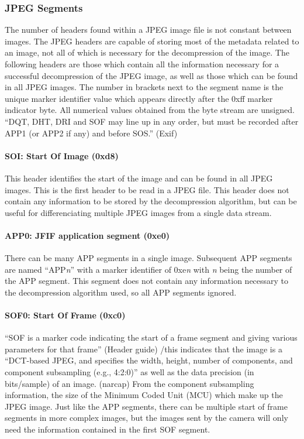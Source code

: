 \documentclass[oneside]{ecsgdp}         %
\begin{document}
\subsubsection{JPEG Segments}
The number of headers found within a JPEG image file is not constant between images. The JPEG headers are capable of storing most of the metadata related to an image, not all of which is necessary for the decompression of the image. The following headers are those which contain all the information necessary for a successful decompression of the JPEG image, as well as those which can be found in all JPEG images. The number in brackets next to the segment name is the unique marker identifier value which appears directly after the 0xff marker indicator byte. All numerical values obtained from the byte stream are unsigned. ``DQT, DHT, DRI and SOF may line up in any order, but must be recorded after APP1 (or APP2 if any) and before SOS.'' (Exif)

\paragraph*{SOI: Start Of Image (0xd8)}
This header identifies the start of the image and can be found in all JPEG images. This is the first header to be read in a JPEG file. This header does not contain any information to be stored by the decompression algorithm, but can be useful for differenciating multiple JPEG images from a single data stream.

\paragraph*{APP0: JFIF application segment (0xe0)}
There can be many APP segments in a single image. Subsequent APP segments are named ``APP\emph{n}'' with a marker identifier of 0xe\emph{n} with \emph{n} being the number of the APP segment. This segment does not contain any information necessary to the decompression algorithm used, so all APP segments ignored.

\paragraph*{SOF0: Start Of Frame (0xc0)}
``SOF is a marker code indicating the start of a frame segment and giving various parameters for that frame'' (Header guide) /this indicates that the image is a ``DCT-based JPEG, and specifies the width, height, number of components, and component subsampling (e.g., 4:2:0)'' as well as the data precision (in bits/sample) of an image. (narcap) From the component subsampling information, the size of the Minimum Coded Unit (MCU) which make up the JPEG image. Just like the APP segments, there can be multiple start of frame segments in more complex images, but the images sent by the camera will only need the information contained in the first SOF segment.
\end{document}
